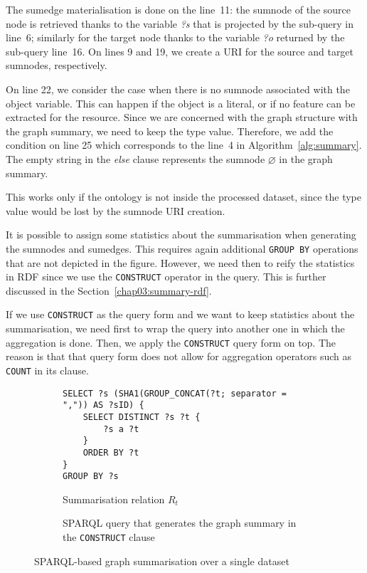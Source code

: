 The sumedge materialisation is done on the line~11: the sumnode of the source node is retrieved thanks to the variable \emph{?s} that is projected by the sub-query in line~6; similarly for the target node thanks to the variable \emph{?o} returned by the sub-query line~16.
On lines 9 and 19, we create a URI for the source and target sumnodes, respectively.

On line 22, we consider the case when there is no sumnode associated with the object variable. This can happen if the object is a literal, or if no feature can be extracted for the resource. Since we are concerned with the graph structure with the graph summary, we need to keep the type value. Therefore, we add the condition on line 25 which corresponds to the line~4 in Algorithm~\ref{alg:summary}.
The empty string in the \emph{else} clause represents the sumnode $\varnothing$ in the graph summary.

\begin{remark}
This works only if the ontology is not inside the processed dataset, since the type value would be lost by the sumnode URI creation.
\end{remark}


It is possible to assign some statistics about the summarisation when generating the sumnodes and sumedges. This requires again additional \texttt{GROUP BY} operations that are not depicted in the figure. However, we need then to reify the statistics in RDF since we use the \texttt{CONSTRUCT} operator in the query. This is further discussed in the Section~\ref{chap03:summary-rdf}.

\begin{remark}
If we use \texttt{CONSTRUCT} as the query form and we want to keep statistics about the summarisation, we need first to wrap the query into another one in which the aggregation is done. Then, we apply the \texttt{CONSTRUCT} query form on top. The reason is that that query form does not allow for aggregation operators such as \texttt{COUNT} in its clause.
\end{remark}

\begin{figure}
	\centering
	\begin{subfigure}{\textwidth}
		\centering
		{\footnotesize
			\begin{verbatim}
SELECT ?s (SHA1(GROUP_CONCAT(?t; separator = ",")) AS ?sID) {
    SELECT DISTINCT ?s ?t {
        ?s a ?t
    }
    ORDER BY ?t
}
GROUP BY ?s
			\end{verbatim}
		}
		\caption{Summarisation relation $R_t$}
		\label{fig:relation-sparql}
	\end{subfigure}
	\qquad
	\begin{subfigure}{\textwidth}
		\centering
		{\footnotesize
			
		}
		\caption{SPARQL query that generates the graph summary in the \texttt{CONSTRUCT} clause}
		\label{fig:sparql-gs}
	\end{subfigure}
	\caption{SPARQL-based graph summarisation over a single dataset}
	\label{fig:gs-sparql-all}
\end{figure}

